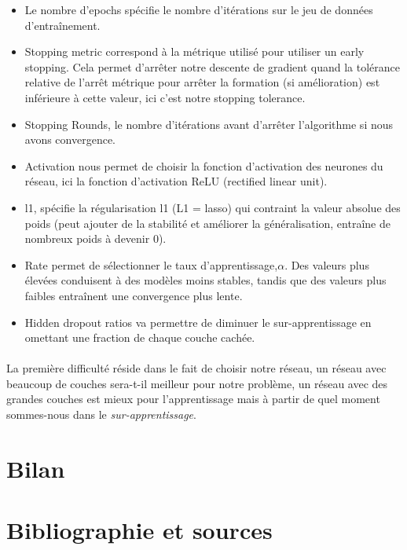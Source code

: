 \documentclass[14pt, openany]{article}
\begin{document}
\begin{itemize}
\item Le nombre d'epochs spécifie le nombre d'itérations sur le jeu de données d'entraînement.
\item Stopping metric correspond à la métrique utilisé pour utiliser un early stopping. Cela permet d'arrêter notre descente de gradient quand la tolérance relative de l'arrêt métrique pour arrêter la formation (si amélioration) est inférieure à cette valeur, ici c'est notre stopping tolerance.
\item Stopping Rounds, le nombre d'itérations avant d'arrêter l'algorithme si nous avons convergence.
\item  Activation nous permet de choisir la fonction d'activation des neurones du réseau, ici la fonction d'activation ReLU (rectified linear unit).
\item l1, spécifie la régularisation l1 (L1 = lasso) qui contraint la valeur absolue des poids (peut ajouter de la stabilité et améliorer la généralisation, entraîne de nombreux poids à devenir 0).
\item Rate permet de sélectionner le taux d'apprentissage,$\alpha$.  Des valeurs plus élevées conduisent à des modèles moins stables, tandis que des valeurs plus faibles entraînent une convergence plus lente.
\item Hidden dropout ratios va permettre de diminuer le sur-apprentissage en omettant une fraction de chaque couche cachée.
\end{itemize}


\paragraph{}
La première difficulté réside dans le fait de choisir notre réseau, un réseau avec beaucoup de couches sera-t-il meilleur pour notre problème, un réseau avec des grandes couches est mieux pour l'apprentissage mais à partir de quel moment sommes-nous dans le \textit{sur-apprentissage}.


\section{Bilan}

\section{Bibliographie et sources}
\end{document}
